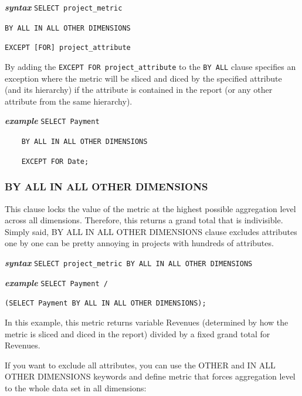 \documentclass[a4paper, 12pt, titlepage, fleqn]{article}
\begin{document}
\textbf{\emph{syntax}}  \hspace{.9cm}\verb=SELECT project_metric=

\hspace{2.2cm}\verb=BY ALL IN ALL OTHER DIMENSIONS=

\hspace{2.2cm}\verb=EXCEPT [FOR] project_attribute=

By adding the \verb=EXCEPT FOR project_attribute= to the \verb=BY ALL= clause specifies an exception where the metric will be sliced and diced by the specified attribute (and its hierarchy) if the attribute is contained in the report (or any other attribute from the same hierarchy).

\textbf{\emph{example}}  \hspace{.9cm}\verb=SELECT Payment=

\hspace{2.2cm}\verb=	BY ALL IN ALL OTHER DIMENSIONS=

\hspace{2.2cm}\verb=	EXCEPT FOR Date;=

\subsubsection{BY ALL IN ALL OTHER DIMENSIONS}
This clause locks the value of the metric at the highest possible aggregation level across all dimensions. Therefore, this returns a grand total that is indivisible. Simply said, BY ALL IN ALL OTHER DIMENSIONS clause excludes attributes one by one can be pretty annoying in projects with hundreds of attributes.

\textbf{\emph{syntax}}  \hspace{.9cm}\verb=SELECT project_metric BY ALL IN ALL OTHER DIMENSIONS=

\textbf{\emph{example}}  \hspace{.9cm}\verb=SELECT Payment /=

\hspace{2.4cm}\verb=(SELECT Payment BY ALL IN ALL OTHER DIMENSIONS);=

In this example, this metric returns variable Revenues (determined by how the metric is sliced and diced in the report) divided by a fixed grand total for Revenues.

If you want to exclude all attributes, you can use the OTHER and IN ALL OTHER DIMENSIONS keywords and define metric that forces aggregation level to the whole data set in all dimensions: 
\end{document}

